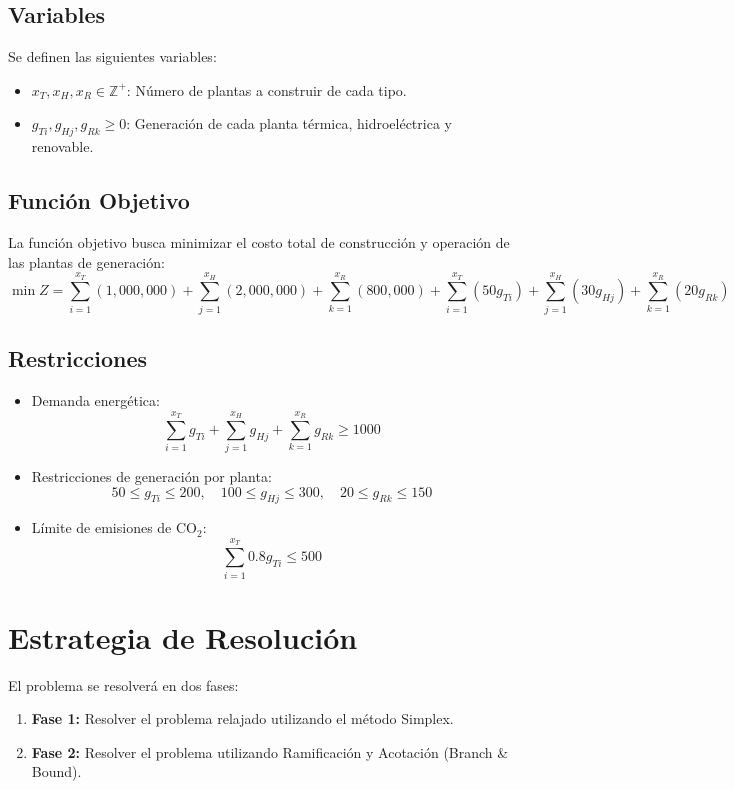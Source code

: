 \documentclass{article}
\begin{document}
\subsection*{Variables}
Se definen las siguientes variables:
\begin{itemize}[noitemsep]
    \item $x_T, x_H, x_R \in \mathbb{Z}^+$: Número de plantas a construir de cada tipo.
    \item $g_{Ti}, g_{Hj}, g_{Rk} \geq 0$: Generación de cada planta térmica, hidroeléctrica y renovable.
\end{itemize}

\subsection*{Función Objetivo}
La función objetivo busca minimizar el costo total de construcción y operación de las plantas de generación:
\[
\min Z = \sum_{i=1}^{x_T} (1,000,000) + \sum_{j=1}^{x_H} (2,000,000) + \sum_{k=1}^{x_R} (800,000) + \sum_{i=1}^{x_T} (50 g_{Ti}) + \sum_{j=1}^{x_H} (30 g_{Hj}) + \sum_{k=1}^{x_R} (20 g_{Rk})
\]

\subsection*{Restricciones}
\begin{itemize}[noitemsep]
    \item Demanda energética: 
    \[
    \sum_{i=1}^{x_T} g_{Ti} + \sum_{j=1}^{x_H} g_{Hj} + \sum_{k=1}^{x_R} g_{Rk} \geq 1000
    \]
    \item Restricciones de generación por planta:
    \[
    50 \leq g_{Ti} \leq 200, \quad 100 \leq g_{Hj} \leq 300, \quad 20 \leq g_{Rk} \leq 150
    \]
    \item Límite de emisiones de CO$_2$:
    \[
    \sum_{i=1}^{x_T} 0.8 g_{Ti} \leq 500
    \]
\end{itemize}

\section*{Estrategia de Resolución}
El problema se resolverá en dos fases:

\begin{enumerate}[noitemsep]
    \item \textbf{Fase 1:} Resolver el problema relajado utilizando el método Simplex.
    \item \textbf{Fase 2:} Resolver el problema utilizando Ramificación y Acotación (Branch \& Bound).
\end{enumerate}
\end{document}
